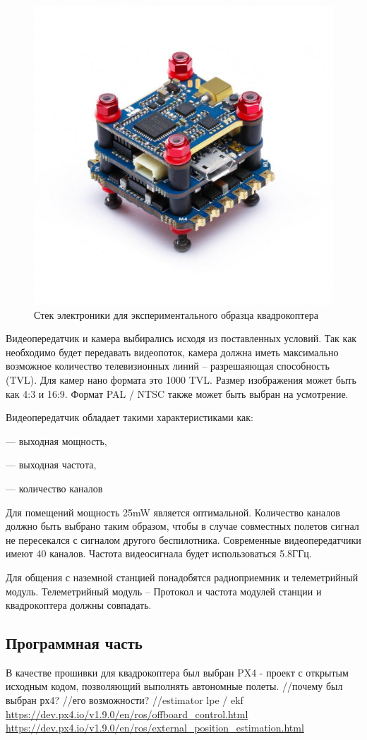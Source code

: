 \begin{figure}[H]
	\centering
	\includegraphics[width=0.5\linewidth]{pics/stack}
	\caption{Стек электроники для экспериментального образца квадрокоптера
	}
	\label{fig:stack} %
\end{figure}
Видеопередатчик и камера выбирались исходя из поставленных условий. Так как необходимо будет передавать видеопоток, камера должна иметь максимально возможное количество телевизионных линий -- разрешаяющая способность (TVL). Для камер нано формата это 1000 TVL. Размер изображения может быть как 4:3 и 16:9. Формат PAL / NTSC также может быть выбран на усмотрение.

Видеопередатчик обладает такими характеристиками как:

--- выходная мощность,

--- выходная частота,

--- количество каналов

Для помещений мощность 25mW является оптимальной. Количество каналов должно быть выбрано таким образом, чтобы в случае совместных полетов сигнал не пересекался с сигналом другого беспилотника. Современные видеопередатчики имеют 40 каналов. Частота видеосигнала будет использоваться 5.8ГГц.

Для общения с наземной станцией понадобятся радиоприемник и телеметрийный модуль. Телеметрийный модуль -- 
Протокол и частота модулей станции и квадрокоптера должны совпадать.%

\subsection{Программная часть}
В качестве прошивки для квадрокоптера был выбран PX4 - проект с открытым исходным кодом, позволяющий выполнять автономные полеты.
//почему был выбран рх4?
//его возможности?
//estimator lpe / ekf
\url{https://dev.px4.io/v1.9.0/en/ros/offboard\_control.html}
\url{https://dev.px4.io/v1.9.0/en/ros/external_position_estimation.html}

